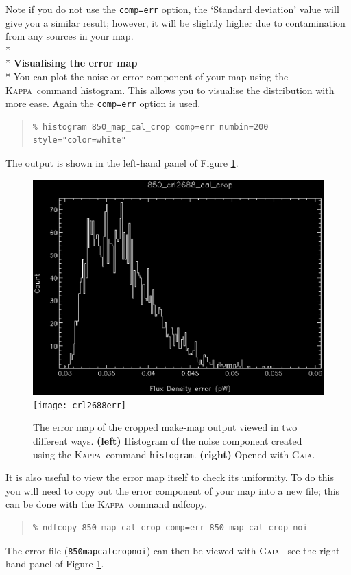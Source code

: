 \documentclass[twoside,11pt]{article}
\newcommand{\xref}[3]{#1}
\renewcommand{\_}{\texttt{\symbol{95}}}
\newenvironment{myquote}{\begin{quote}\begin{small}}{\end{small}\end{quote}}
\newcommand{\gaia}{\xref{\textsc{Gaia}}{sun214}{}}
\newcommand{\Kappa}{\xref{\textsc{Kappa}}{sun95}{}}
\newcommand{\task}[1]{\textsf{#1}}
\newcommand{\param}[1]{\texttt{#1}}
\newcommand{\histogram}{\xref{\task{histogram}}{sun95}{HISTOGRAM}}
\newcommand{\ndfcopy}{\xref{\task{ndfcopy}}{sun95}{NDFCOPY}}
\begin{document}
Note if you do not use the \param{comp=err} option, the `Standard deviation' value will give you a similar result; however, it will be slightly higher due to contamination from any sources in your map.
\\*\\*
\textbf{Visualising the error map}\\*
You can plot the noise or error component of your map using the \Kappa\ command \histogram. This allows you to visualise the distribution with more ease. Again the \param{comp=err} option is used.
\begin{myquote}
\begin{verbatim}
% histogram 850_map_cal_crop comp=err numbin=200  style="color=white"
\end{verbatim}
\end{myquote}
The output is shown in the left-hand panel of Figure \ref{fig:noi}.
\begin{figure}
\begin{center}
\includegraphics[width=0.53\linewidth]{noihist}
\texttt{[image: crl2688\_err]}
\caption{\small The error map of the cropped make-map output viewed in two different ways. \textbf{(left)} Histogram of the noise component created using the \Kappa\  command \texttt{histogram}. \textbf{(right)} Opened with \gaia.}
\label{fig:noi}
\end{center}
\end{figure}

It is also useful to view the error map itself to check its uniformity. To do this you will need to copy out the error component of your map into a new file; this can be done with the \Kappa\ command \ndfcopy.
\begin{myquote}
\begin{verbatim}
% ndfcopy 850_map_cal_crop comp=err 850_map_cal_crop_noi
\end{verbatim}
\end{myquote}
The error file (\texttt{850\_map\_cal\_crop\_noi}) can then be viewed with \gaia -- see the right-hand panel of Figure \ref{fig:noi}.
\end{document}
